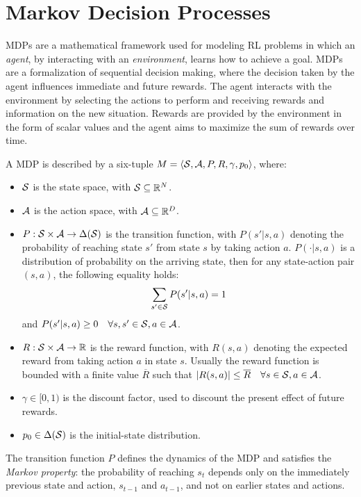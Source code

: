 \section{Markov Decision Processes}\label{sec:mdp}
\ac{MDPs} are a mathematical framework used for modeling \ac{RL} problems in which an \emph{agent}, by interacting with an \emph{environment}, learns how to achieve a goal. \ac{MDPs} are a formalization of sequential decision making, where the decision taken by the agent influences immediate and future rewards. The agent interacts with the environment by selecting the actions to perform and receiving rewards and information on the new situation. Rewards are provided by the environment in the form of scalar values and the agent aims to maximize the sum of rewards over time.
\begin{definition}[MDP]\label{def:mdp}
\sloppy A \acf{MDP} is described by a six-tuple $M=\langle \mathcal{S}, \mathcal{A}, P, R, \gamma, p_0 \rangle$, where:
\begin{itemize}
	\item $\mathcal{S}$ is the state space, with $\mathcal{S}\subseteq\mathbb{R}^N$.
	\item $\mathcal{A}$ is the action space, with $\mathcal{A}\subseteq\mathbb{R}^D$.
	\item $P: \mathcal{S} \times \mathcal{A} \to \Delta(\mathcal{S})$ is the transition function, with $P(s'|s,a)$ denoting the probability of reaching state $s'$ from state $s$ by taking action $a$. $P(\cdot|s,a)$ is a distribution of probability on the arriving state, then for any state-action pair $(s,a)$, the following equality holds:
	\begin{align} \sum_{s' \in \mathcal{S}} P(s'|s,a) = 1 \end{align}
	and $P(s'|s,a) \geq 0 \quad \forall s, s' \in \mathcal{S}, a \in \mathcal{A}$.
	\item $R: \mathcal{S} \times \mathcal{A} \to \mathbb{R}$ is the reward function, with $R(s,a)$ denoting the expected reward from taking action $a$ in state $s$. Usually the reward function is bounded with a finite value $\overline{R}$ such that $|R(s,a)| \leq \overline{R} \quad \forall s \in \mathcal{S}, a \in \mathcal{A}$.
	\item $\gamma \in [0, 1)$ is the discount factor, used to discount the present effect of future rewards.
	\item $p_0 \in \Delta(\mathcal{S})$ is the initial-state distribution.
\end{itemize}
\end{definition}
\noindent The transition function $P$ defines the dynamics of the \ac{MDP} and satisfies the \emph{Markov property}: the probability of reaching $s_t$ depends only on the immediately previous state and action, $s_{t-1}$ and $a_{t-1}$, and not on earlier states and actions.\\
